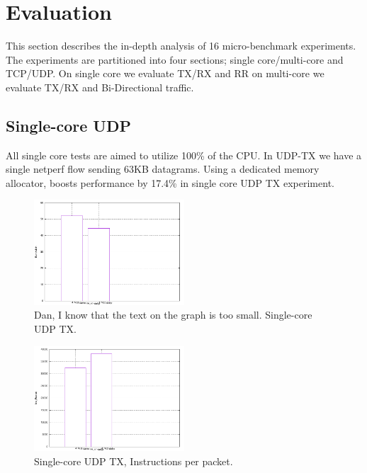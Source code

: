 \section{Evaluation}
This section describes the in-depth analysis of 16 micro-benchmark experiments.
The experiments are partitioned into four sections; single core/multi-core and TCP/UDP.
On single core we evaluate TX/RX and RR on multi-core we evaluate TX/RX and Bi-Directional traffic.




\subsection{Single-core UDP}
All single core tests are aimed to utilize 100\% of the CPU. In UDP-TX we have a single netperf flow sending 63KB datagrams. Using a dedicated memory allocator, boosts performance by 17.4\% in single core UDP TX experiment.

\begin{figure}
\centering
\includegraphics[width=0.5\textwidth]{figures/single_udp_tx_Bandwidth.pdf}
\caption{\label{fig:s-u-tx} Dan, I know that the text on the graph is too small. Single-core UDP TX.}
\end{figure}

\begin{figure}
\centering
\includegraphics[width=0.5\textwidth]{figures/single_udp_tx_Ins_Packet.pdf}
\caption{\label{fig:s-u-tx-ipp} Single-core UDP TX, Instructions per packet.}
\end{figure}

